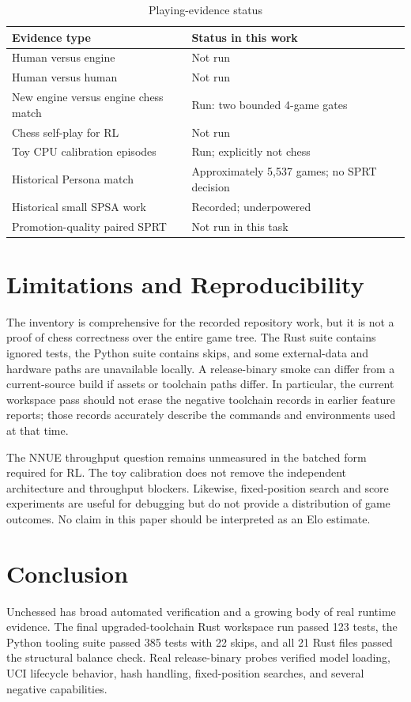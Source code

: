 \documentclass[conference]{IEEEtran}
\begin{document}
\begin{table}[t]
\caption{Playing-evidence status}
\label{tab:playing}
\centering
\footnotesize
\begin{tabularx}{\columnwidth}{@{}Y Y@{}}
\toprule
Evidence type & Status in this work \\
\midrule
Human versus engine & Not run \\
Human versus human & Not run \\
New engine versus engine chess match & Run: two bounded 4-game gates \\
Chess self-play for RL & Not run \\
Toy CPU calibration episodes & Run; explicitly not chess \\
Historical Persona match & Approximately 5,537 games; no SPRT decision \\
Historical small SPSA work & Recorded; underpowered \\
Promotion-quality paired SPRT & Not run in this task \\
\bottomrule
\end{tabularx}
\end{table}

\section{Limitations and Reproducibility}
The inventory is comprehensive for the recorded repository work, but it is not a proof of chess correctness over the entire game tree. The Rust suite contains ignored tests, the Python suite contains skips, and some external-data and hardware paths are unavailable locally. A release-binary smoke can differ from a current-source build if assets or toolchain paths differ. In particular, the current workspace pass should not erase the negative toolchain records in earlier feature reports; those records accurately describe the commands and environments used at that time.

The NNUE throughput question remains unmeasured in the batched form required for RL. The toy calibration does not remove the independent architecture and throughput blockers. Likewise, fixed-position search and score experiments are useful for debugging but do not provide a distribution of game outcomes. No claim in this paper should be interpreted as an Elo estimate.

\section{Conclusion}
Unchessed has broad automated verification and a growing body of real runtime evidence. The final upgraded-toolchain Rust workspace run passed 123 tests, the Python tooling suite passed 385 tests with 22 skips, and all 21 Rust files passed the structural balance check. Real release-binary probes verified model loading, UCI lifecycle behavior, hash handling, fixed-position searches, and several negative capabilities.
\end{document}
